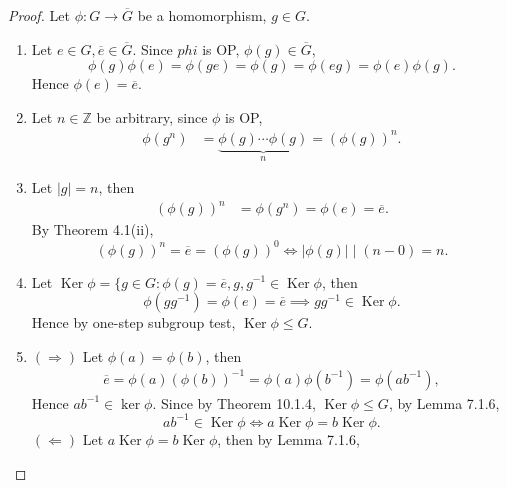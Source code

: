 \documentclass{article}
\theoremstyle{definition}
\DeclareMathOperator{\Ker}{Ker}
\begin{document}
    \begin{proof}
       Let $\phi:G \to \overline{G}$ be a homomorphism, $g \in G$.
       \begin{enumerate}
           \item Let $e \in G, \overline{e} \in \overline{G}$. Since $phi$ is OP, $\phi(g) \in \overline{G}$,
           \begin{equation*}
               \phi(g)\phi(e) = \phi(ge) = \phi(g) = \phi(eg) = \phi(e)\phi(g).
           \end{equation*}
           Hence $\phi(e) = \overline{e}$.
           \item Let $n \in \mathbb{Z}$ be arbitrary, since $\phi$ is OP,
           \begin{align*}
               \phi(g^n) &= \underbrace{\phi(g)\cdots\phi(g)}_n = (\phi(g))^n.
           \end{align*}
           \item Let $|g|=n$, then
           \begin{align*}
               (\phi(g))^n &= \phi(g^n) = \phi(e) = \overline{e}.
           \end{align*}
           By Theorem 4.1(ii),
           \begin{equation*}
               (\phi(g))^n = \overline{e} = (\phi(g))^0 \iff |\phi(g)| \mid (n-0) = n.
           \end{equation*}
           \item Let $\Ker\phi=\{g\in G: \phi(g)=\overline{e}, g,g^{-1} \in \Ker\phi$, then
           \begin{equation*}
               \phi(gg^{-1}) = \phi(e) = \overline{e} \implies gg^{-1} \in \Ker\phi.
           \end{equation*}
           Hence by one-step subgroup test, $\Ker\phi \leq G$.
           \item $(\Rightarrow)$ Let $\phi(a) = \phi(b)$, then
           \begin{align*}
               \overline{e} = \phi(a)(\phi(b))^{-1} = \phi(a)\phi(b^{-1}) = \phi(ab^{-1}),
           \end{align*}
           Hence $ab^{-1}\in \ker\phi$. Since by Theorem 10.1.4, $\Ker\phi \leq G$, by Lemma 7.1.6,
           \begin{equation*}
               ab^{-1} \in \Ker\phi \iff a\Ker\phi = b\Ker\phi.
           \end{equation*} 
           $(\Leftarrow)$ Let $a\Ker\phi = b\Ker\phi$, then by Lemma 7.1.6,
           \begin{equation*}

\end{equation*}
\end{enumerate}
\end{proof}
\end{document}
